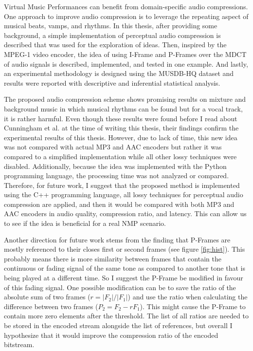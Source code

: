 \label{chapter:concl}

Virtual Music Performances can benefit from domain-specific audio compressions. One approach to improve audio compression is to leverage the repeating aspect of musical beats, vamps, and rhythms. In this thesis, after providing some background, a simple implementation of perceptual audio compression is described that was used for the exploration of ideas. Then, inspired by the MPEG-1 video encoder, the idea of using I-Frame and P-Frames over the MDCT of audio signals is described, implemented, and tested in one example. And lastly, an experimental methodology is designed using the MUSDB-HQ dataset and results were reported with descriptive and inferential statistical analysis.

The proposed audio compression scheme shows promising results on mixture and background music in which musical rhythms can be found but for a vocal track, it is rather harmful. Even though these results were found before I read about Cunningham et al. at the time of writing this thesis, their findings confirm the experimental results of this thesis. However, due to lack of time, this new idea was not compared with actual MP3 and AAC encoders but rather it was compared to a simplified implementation while all other lossy techniques were disabled. Additionally, because the idea was implemented with the Python programming language, the processing time was not analyzed or compared. Therefore, for future work, I suggest that the proposed method is implemented using the C++ programming language, all lossy techniques for perceptual audio compression are applied, and then it would be compared with both MP3 and AAC encoders in audio quality, compression ratio, and latency. This can allow us to see if the idea is beneficial for a real NMP scenario.

Another direction for  future work stems from the finding that P-Frames are mostly referenced to their closes first or second frames (see figure \ref{fig:hist}). This probably means there is more similarity between frames that contain the continuous or fading signal of the same tone as compared to another tone that is being played at a different time. So I suggest the P-Frame be modified in favour of this fading signal. One possible modification can be to save the ratio of the absolute sum of two frames ($r = |F_2|/|F_1|$) and use the ratio when calculating the difference between two frames ($P_2=F_2-rF_1$). This might cause the P-Frame to contain more zero elements after the threshold. The list of all ratios are needed to be stored in the encoded stream alongside the list of references, but overall I hypothesize that it would improve the compression ratio of the encoded bitstream. 



